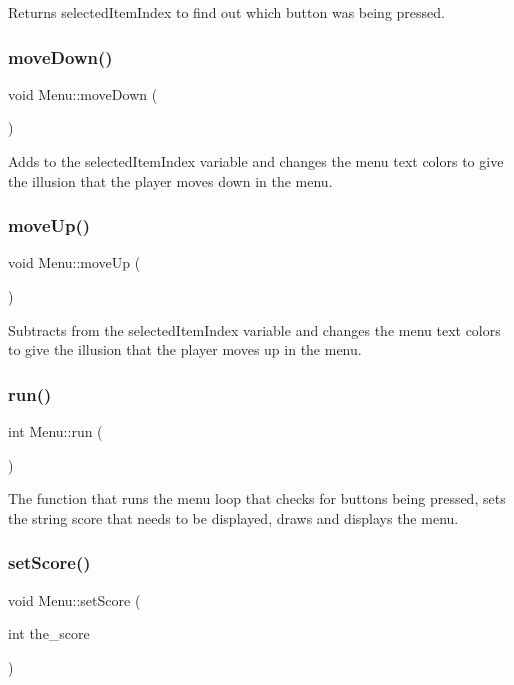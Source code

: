 Returns selected\+Item\+Index to find out which button was being pressed. \mbox{\label{classMenu_abbec620bd41608fba287400ead4467aa}} 
\subsubsection{\texorpdfstring{move\+Down()}{moveDown()}}
{\footnotesize\ttfamily void Menu\+::move\+Down (\begin{DoxyParamCaption}{ }\end{DoxyParamCaption})}

Adds to the selected\+Item\+Index variable and changes the menu text colors to give the illusion that the player moves down in the menu. \mbox{\label{classMenu_abfa1619b1d868d85b3978f5918c2a56f}} 
\subsubsection{\texorpdfstring{move\+Up()}{moveUp()}}
{\footnotesize\ttfamily void Menu\+::move\+Up (\begin{DoxyParamCaption}{ }\end{DoxyParamCaption})}

Subtracts from the selected\+Item\+Index variable and changes the menu text colors to give the illusion that the player moves up in the menu. \mbox{\label{classMenu_af93a970cdfec463a8cb25ca65bf51da5}} 
\subsubsection{\texorpdfstring{run()}{run()}}
{\footnotesize\ttfamily int Menu\+::run (\begin{DoxyParamCaption}{ }\end{DoxyParamCaption})}

The function that runs the menu loop that checks for buttons being pressed, sets the string score that needs to be displayed, draws and displays the menu. \mbox{\label{classMenu_a9516e2d4872c03ba5a436216d1729e35}} 
\subsubsection{\texorpdfstring{set\+Score()}{setScore()}}
{\footnotesize\ttfamily void Menu\+::set\+Score (\begin{DoxyParamCaption}\item[{int}]{the\+\_\+score }\end{DoxyParamCaption})}

